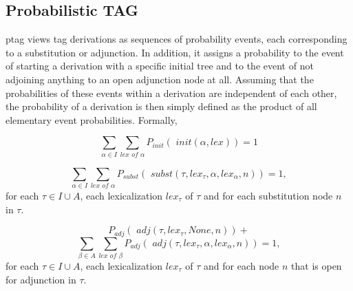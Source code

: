 \subsection{Probabilistic TAG}
\label{ssec:probmodels}
{\sc ptag} \cite{resnik1992} views {\sc tag} derivations as sequences of probability events, each corresponding to a substitution or adjunction. In addition, it assigns a probability to the event of starting a derivation with a specific initial tree and to the event of not adjoining anything to an open adjunction node at all. Assuming that the probabilities of these events within a derivation are independent of each other, the probability of a derivation is then simply defined as the product of all elementary event probabilities. 
Formally,

\newcommand{\adj}[0]{\textit{ adj}}
\newcommand{\init}[0]{\textit{ init}}
\newcommand{\subst}[0]{\textit{ subst}}
$$ \sum\limits_{\alpha \in I}\sum\limits_{lex \textit{ of } \alpha} P_{init}(\init(\alpha, lex)) = 1 $$

$$\sum\limits_{\alpha \in I}\sum\limits_{lex \textit{ of }\alpha} P_{subst}(\subst(\tau,lex_\tau, \alpha, lex_\alpha, n)) = 1,$$
for each $\tau \in I \cup A$, each lexicalization $lex_\tau$  of $\tau$ and for each substitution node $n$ in $\tau$.

$$ P_{adj}(\adj(\tau, lex_\tau, \textit{None},n)) +$$
$$ \sum\limits_{\beta \in A}\sum\limits_{lex \textit{ of }\beta} P_{adj}(\adj(\tau,lex_\tau, \alpha, lex_\alpha, n)) = 1,$$ for each $\tau \in I \cup A$, each lexicalization $lex_\tau$  of $\tau$ and for each node $n$ that is open for adjunction in $\tau$.

